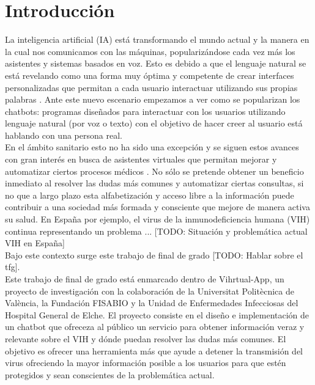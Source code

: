 \section{Introducción}
La inteligencia artificial (IA) está transformando el mundo actual y la manera en la cual nos comunicamos con las máquinas, popularizándose cada vez más los asistentes y sistemas basados en voz. Esto es debido a que el lenguaje natural se está revelando como una forma muy óptima y competente de crear interfaces personalizadas que permitan a cada usuario interactuar utilizando sus propias palabras \cite{naturalDialogue} . Ante este nuevo escenario empezamos a ver como se popularizan los chatbots: programas diseñados para interactuar con los usuarios utilizando lenguaje natural (por voz o texto) con el objetivo de hacer creer al usuario está hablando con una persona real. \\

En el ámbito sanitario esto no ha sido una excepción y se siguen estos avances con gran interés en busca de asistentes virtuales que permitan mejorar y automatizar ciertos procesos médicos \cite{healthAgents}. No sólo se pretende obtener un beneficio inmediato al resolver las dudas más comunes y automatizar ciertas consultas, si no que a largo plazo esta alfabetización y acceso libre a la información puede contribuir a una sociedad más formada y consciente que mejore de manera activa su salud. En España por ejemplo, el virus de la inmunodeficiencia humana (VIH) continua representando un problema ... [TODO: Situación y problemática actual VIH en España]\\

Bajo este contexto surge este trabajo de final de grado [TODO: Hablar sobre el tfg].\\

Este trabajo de final de grado está enmarcado dentro de Vihrtual-App, un proyecto de investigación con la colaboración de la Universitat Politècnica de València, la Fundación FISABIO y la Unidad de Enfermedades Infecciosas del Hospital General de Elche. El proyecto consiste en el diseño e implementación de un chatbot que ofreceza al público un servicio para obtener información veraz y relevante sobre el VIH y dónde puedan resolver las dudas más comunes. El objetivo es ofrecer una herramienta más que ayude a detener la transmisión del virus ofreciendo la mayor información posible a los usuarios para que estén protegidos y sean conscientes de la problemática actual.\\ %

